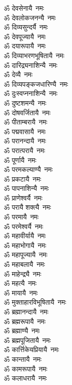 \begin{flushleft}
\begin{multicols}{2}
ॐ देवसेनायै~नमः\\
ॐ देवलोकजनन्यै~नमः\\
ॐ दिव्यसुन्दर्यै~नमः\\
ॐ देवपूज्यायै~नमः\\
ॐ दयारूपायै~नमः\\
ॐ दिव्याभरणभूषितायै~नमः\\
ॐ दारिद्र्यनाशिन्यै~नमः\\
ॐ देव्यै~नमः\\
ॐ दिव्यपङ्कजधारिण्यै~नमः\\
ॐ दुःस्वप्ननाशिन्यै~नमः\hfill{}\\
ॐ दुष्टशमन्यै~नमः\\
ॐ दोषवर्जितायै~नमः\\
ॐ पीताम्बरायै~नमः\\
ॐ पद्मवासायै~नमः\\
ॐ परानन्दायै~नमः\\
ॐ परात्परायै~नमः\\
ॐ पूर्णायै~नमः\\
ॐ परमकल्याण्यै~नमः\\
ॐ प्रकटायै~नमः\\
ॐ पापनाशिन्यै~नमः\hfill{}\\
ॐ प्राणेश्वर्यै~नमः\\
ॐ परायै शक्त्यै~नमः\\
ॐ परमायै~नमः\\
ॐ परमेश्वर्यै~नमः\\
ॐ महावीर्यायै~नमः\\
ॐ महाभोगायै~नमः\\
ॐ महापूज्यायै~नमः\\
ॐ महाबलायै~नमः\\
ॐ माहेन्द्र्यै~नमः\\
ॐ महत्यै~नमः\hfill{}\\
ॐ मायायै~नमः\\
ॐ मुक्ताहारविभूषितायै~नमः\\
ॐ ब्रह्मानन्दायै~नमः\\
ॐ ब्रह्मरूपायै~नमः\\
ॐ ब्रह्माण्यै~नमः\\
ॐ ब्रह्मपूजितायै~नमः\\
ॐ कार्त्तिकेयप्रियायै~नमः\\
ॐ कान्तायै~नमः\\
ॐ कामरूपायै~नमः\\
ॐ कलाधरायै~नमः\hfill{}\\

\end{multicols}
\end{flushleft}
